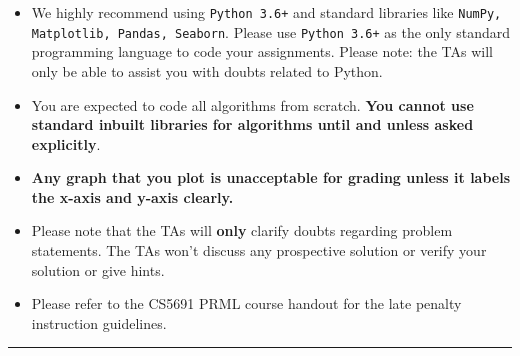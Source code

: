 \documentclass[addpoints,12pt,solution]{exam}
\begin{document}
{\begin{itemize}
\item We highly recommend using \texttt{Python 3.6+} and standard libraries like \texttt{NumPy, Matplotlib, Pandas, Seaborn}. Please use \texttt{Python 3.6+} as the only standard programming language to code your assignments. Please note: the TAs will only be able to assist you with doubts related to Python. 

\item You are expected to code all algorithms from scratch. \textbf{You cannot
use standard inbuilt libraries for algorithms until and unless asked explicitly}.



\item \textbf{Any graph that you plot is unacceptable for grading unless it labels the x-axis and
y-axis clearly.}


\item Please note that the TAs will \textbf{only} clarify doubts regarding problem statements. The TAs won't discuss any prospective solution or verify your solution or give hints.  

\item Please refer to the CS5691 PRML course handout for the late penalty instruction guidelines.



\end{itemize}
}

\hrule

\vspace{3mm}
\end{document}
